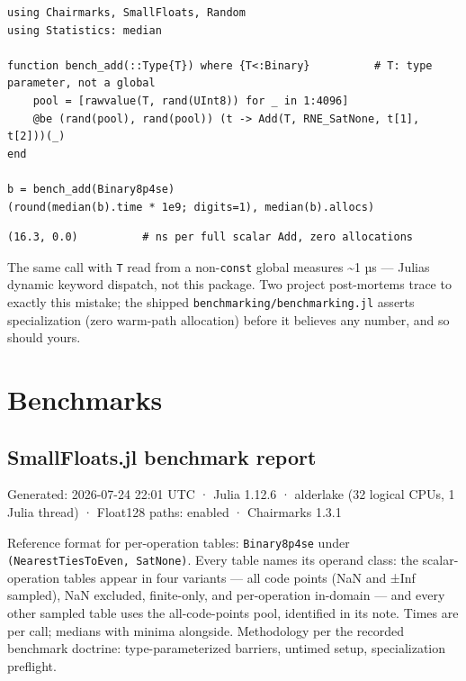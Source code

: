\begin{verbatim}
using Chairmarks, SmallFloats, Random
using Statistics: median

function bench_add(::Type{T}) where {T<:Binary}          # T: type parameter, not a global
    pool = [rawvalue(T, rand(UInt8)) for _ in 1:4096]
    @be (rand(pool), rand(pool)) (t -> Add(T, RNE_SatNone, t[1], t[2]))(_)
end

b = bench_add(Binary8p4se)
(round(median(b).time * 1e9; digits=1), median(b).allocs)
\end{verbatim}




\begin{verbatim}
(16.3, 0.0)          # ns per full scalar Add, zero allocations
\end{verbatim}



\begin{tcolorbox}[toptitle=-1mm,bottomtitle=1mm,colback=admonition-warning!50!white,colframe=admonition-warning,title=\textbf{The 60× trap}]
The same call with \texttt{T} read from a non-\texttt{const} global measures {\textasciitilde}1 µs — Julia{\textquotesingle}s dynamic keyword dispatch, not this package. Two project post-mortems trace to exactly this mistake; the shipped \texttt{benchmarking/benchmarking.jl} asserts specialization (zero warm-path allocation) before it believes any number, and so should yours.

\end{tcolorbox}


\part{Benchmarks}


\chapter{SmallFloats.jl benchmark report}



\label{17395114360235324059}{}


Generated: 2026-07-24 22:01 UTC  ·  Julia 1.12.6  ·  alderlake (32 logical CPUs, 1 Julia thread)  ·  Float128 paths: enabled  ·  Chairmarks 1.3.1



Reference format for per-operation tables: \texttt{Binary8p4se} under \texttt{(NearestTiesToEven, SatNone)}. Every table names its operand class: the scalar-operation tables appear in four variants — all code points (NaN and ±Inf sampled), NaN excluded, finite-only, and per-operation in-domain — and every other sampled table uses the all-code-points pool, identified in its note. Times are per call; medians with minima alongside. Methodology per the recorded benchmark doctrine: type-parameterized barriers, untimed setup, specialization preflight.




